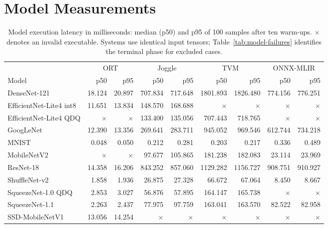 \section{Model Measurements}
\label{sec:model-data}

\begin{table}[!htbp]
  \caption{Model execution latency in milliseconds: median (p50) and p95 of
  100 samples after ten warm-ups. $\times$ denotes an invalid executable.
  Systems use identical input tensors; Table~\ref{tab:model-failures} identifies
  the terminal phase for excluded cases.}
  \label{tab:model-data}
  \centering
  \scriptsize
  \setlength{\tabcolsep}{2.5pt}
  \renewcommand{\arraystretch}{1.18}
  \begin{tabular*}{\textwidth}{@{\extracolsep{\fill}}lrrrrrrrr@{}}
    \toprule
    & \multicolumn{2}{c}{ORT} & \multicolumn{2}{c}{Joggle}
    & \multicolumn{2}{c}{TVM} & \multicolumn{2}{c}{ONNX-MLIR} \\
    \cmidrule(lr){2-3}\cmidrule(lr){4-5}\cmidrule(lr){6-7}\cmidrule(l){8-9}
    Model & p50 & p95 & p50 & p95 & p50 & p95 & p50 & p95 \\
    \midrule
    DenseNet-121 & 18.124 & 20.897 & 707.834 & 717.648 & 1801.893 & 1826.480 & 774.156 & 776.251 \\
    EfficientNet-Lite4 int8 & 11.651 & 13.834 & 148.570 & 168.688 & $\times$ & $\times$ & $\times$ & $\times$ \\
    EfficientNet-Lite4 QDQ & $\times$ & $\times$ & 133.400 & 135.056 & 707.443 & 718.765 & $\times$ & $\times$ \\
    GoogLeNet & 12.390 & 13.356 & 269.641 & 283.711 & 945.052 & 969.546 & 612.744 & 734.218 \\
    MNIST & 0.048 & 0.050 & 0.212 & 0.281 & 0.203 & 0.217 & 0.336 & 0.489 \\
    MobileNetV2 & $\times$ & $\times$ & 97.677 & 105.865 & 181.238 & 182.083 & 23.114 & 23.969 \\
    ResNet-18 & 14.358 & 16.206 & 843.252 & 857.060 & 1129.282 & 1156.727 & 908.751 & 910.927 \\
    ShuffleNet-v2 & 1.858 & 1.936 & 26.875 & 27.328 & 66.672 & 67.064 & 8.450 & 8.667 \\
    SqueezeNet-1.0 QDQ & 2.853 & 3.027 & 56.876 & 57.895 & 164.147 & 165.738 & $\times$ & $\times$ \\
    SqueezeNet-1.1 & 2.263 & 2.437 & 77.975 & 97.759 & 163.041 & 163.570 & 82.522 & 82.958 \\
    SSD-MobileNetV1 & 13.056 & 14.254 & $\times$ & $\times$ & $\times$ & $\times$ & $\times$ & $\times$ \\

\end{tabular*}
\end{table}
